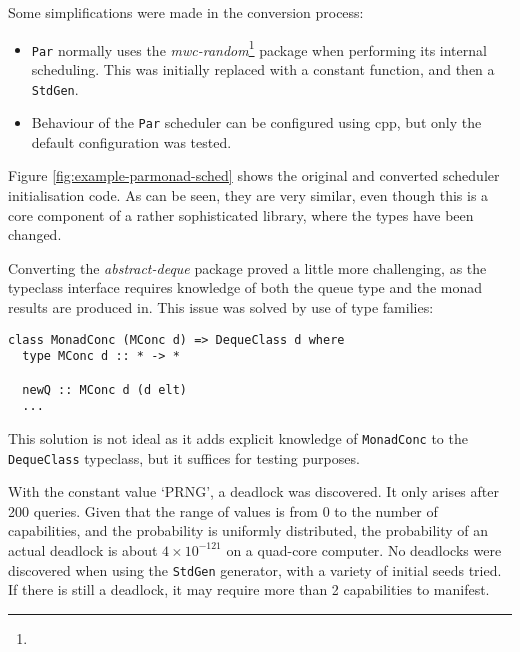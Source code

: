 Some simplifications were made in the conversion process:

\begin{itemize}
\item \verb|Par| normally uses the
  \emph{mwc-random}\footnote{} package when
  performing its internal scheduling. This was initially replaced with
  a constant function, and then a \verb|StdGen|.

\item Behaviour of the \verb|Par| scheduler can be configured using
  cpp, but only the default configuration was tested.
\end{itemize}

Figure \ref{fig:example-parmonad-sched} shows the original and
converted scheduler initialisation code. As can be seen, they are very
similar, even though this is a core component of a rather
sophisticated library, where the types have been changed.

Converting the \emph{abstract-deque} package proved a little more
challenging, as the typeclass interface requires knowledge of both the
queue type and the monad results are produced in. This issue was
solved by use of type families:

\begin{verbatim}
class MonadConc (MConc d) => DequeClass d where
  type MConc d :: * -> *

  newQ :: MConc d (d elt)
  ...
\end{verbatim}

This solution is not ideal as it adds explicit knowledge of
\verb|MonadConc| to the \verb|DequeClass| typeclass, but it suffices
for testing purposes.

With the constant value `PRNG', a deadlock was discovered. It only
arises after 200 queries. Given that the range of values is from 0 to
the number of capabilities, and the probability is uniformly
distributed, the probability of an actual deadlock is about $4 \times
10^{-121}$ on a quad-core computer. No deadlocks were discovered when
using the \verb|StdGen| generator, with a variety of initial seeds
tried. If there is still a deadlock, it may require more than 2
capabilities to manifest.

